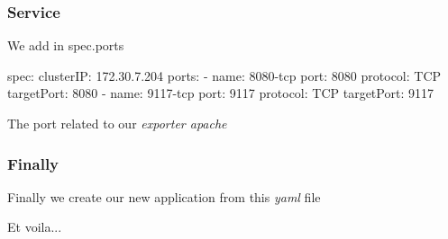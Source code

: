 \documentclass{beamer}
\begin{document}
\begin{frame}[fragile]
  \frametitle{Service}
  We add in spec.ports
  \begin{yamlcode}
    spec:                                                                                                             
      clusterIP: 172.30.7.204                                                                                         
      ports:                                                                                                          
      - name: 8080-tcp                                                                                                
      port: 8080                                                                                                    
      protocol: TCP                                                                                                 
      targetPort: 8080 
      - name: 9117-tcp
      port: 9117
      protocol: TCP
      targetPort: 9117
  \end{yamlcode}
  The port related to our \emph{exporter apache}
\end{frame}

\begin{frame}[fragile]
  \frametitle{Finally}
  Finally we create our new application from this \emph{yaml} file
  Et voila...
\end{frame}
\end{document}
